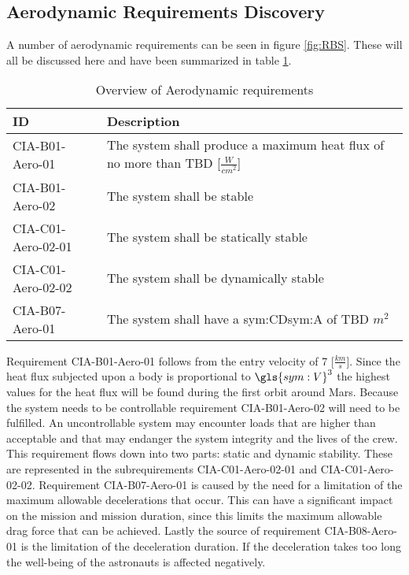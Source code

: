 \subsection{Aerodynamic Requirements Discovery} 
\label{sec:aero}
A number of aerodynamic requirements can be seen in figure \ref{fig:RBS}. These will all be discussed here and have been summarized in table \ref{tab:aeroreqs}. 


\begin{table}[h]
	\caption{Overview of Aerodynamic requirements}
	\label{tab:aeroreqs}
	\begin{tabular}{|p{}|p{}|}
		\hline
		ID & Description \\
		\hline \hline
		CIA-B01-Aero-01 & The system shall produce a maximum heat flux of no more than TBD [$\frac{W}{cm^{2}}$] \\ \hline
		CIA-B01-Aero-02 & The system shall be stable \\ \hline
		CIA-C01-Aero-02-01 & The system shall be statically stable \\ \hline
		CIA-C01-Aero-02-02 & The system shall be dynamically stable \\ \hline
		CIA-B07-Aero-01 & The system shall have a \gls{sym:CD}\gls{sym:A} of TBD $m^{2}$ \\ \hline
	\end{tabular}
\end{table}

Requirement CIA-B01-Aero-01 follows from the entry velocity of 7 [$\frac{km}{s}$]. Since the heat flux subjected upon a body is proportional to $\gls{sym:V}^{3}$ \cite{Tauber1986} the highest values for the heat flux will be found during the first orbit around Mars. 
Because the system needs to be controllable requirement CIA-B01-Aero-02 will need to be fulfilled. An uncontrollable system may encounter loads that are higher than acceptable and that may endanger the system integrity and the lives of the crew. This requirement flows down into two parts: static and dynamic stability. These are represented in the subrequirements CIA-C01-Aero-02-01 and CIA-C01-Aero-02-02.
Requirement CIA-B07-Aero-01 is caused by the need for a limitation of the maximum allowable decelerations that occur. This can have a significant impact on the mission and mission duration, since this limits the maximum allowable drag force that can be achieved.
Lastly the source of requirement CIA-B08-Aero-01 is the limitation of the deceleration duration. If the deceleration takes too long the well-being of the astronauts is affected negatively.
